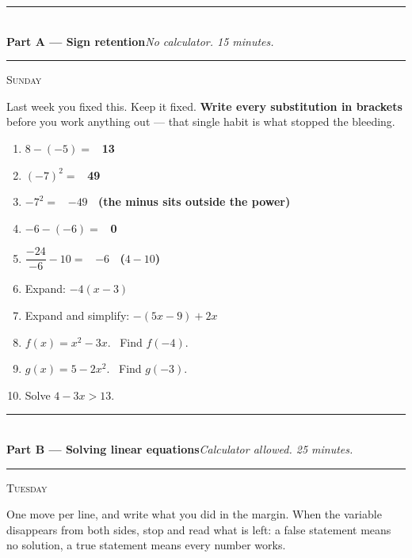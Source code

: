 \documentclass[11pt,a4paper]{article}
\newif\ifANSWERS
\newcommand{\PartHead}[2]{%
  \vspace{6pt}
  {\color{navy}\rule{\textwidth}{0.8pt}}\\[2pt]
  {\large\bfseries\color{navy}#1}\hfill{\small\itshape #2}\\[-4pt]
  {\color{navy}\rule{\textwidth}{0.4pt}}
  \vspace{4pt}
}
\newcommand{\sitting}[1]{{\footnotesize\textsc{\color{navy}#1}}\par\vspace{2pt}}
\newcommand{\ans}[1]{\ {\color{keyred}\bfseries #1}}
\newcommand{\note}[1]{\par{\footnotesize\color{keyred}#1}}
\newcommand{\ans}[1]{}
\newcommand{\note}[1]{}
\begin{document}
\PartHead{Part A --- Sign retention}{No calculator. 15 minutes.}
\sitting{Sunday}
Last week you fixed this. Keep it fixed. \textbf{Write every substitution in brackets}
before you work anything out --- that single habit is what stopped the bleeding.

\begin{enumerate}[leftmargin=20pt,itemsep=7pt]
\item $8-(-5)=$ \ifANSWERS\else\underline{\hspace{3.5cm}}\fi \ans{13}
\item $(-7)^2=$ \ifANSWERS\else\underline{\hspace{3.5cm}}\fi \ans{49}
\item $-7^2=$ \ifANSWERS\else\underline{\hspace{3.5cm}}\fi \ans{$-49$ \ (the minus sits outside the power)}
\item $-6-(-6)=$ \ifANSWERS\else\underline{\hspace{3.5cm}}\fi \ans{0}
\item $\dfrac{-24}{-6}-10=$ \ifANSWERS\else\underline{\hspace{3.5cm}}\fi \ans{$-6$ \ ($4-10$)}
\item Expand: $-4(x-3)$ \ifANSWERS\ans{$=-4x+12$}\else\ \underline{\hspace{5.4cm}}\fi
\item Expand and simplify: $-(5x-9)+2x$ \ifANSWERS\ans{$=-3x+9$}\else\ \underline{\hspace{4cm}}\fi
\item $f(x)=x^2-3x$. \ Find $f(-4)$. \ifANSWERS\ans{$=(-4)^2-3(-4)=16+12=28$}\else\ \underline{\hspace{4cm}}\fi
\item $g(x)=5-2x^2$. \ Find $g(-3)$. \ifANSWERS\ans{$=5-2(9)=-13$}\else\ \underline{\hspace{4cm}}\fi
\item Solve $4-3x>13$. \ifANSWERS\ans{$x<-3$. \ $-3x>9$, then divide by $-3$ \emph{and flip}. Check: $x=-4$ gives $16>13$, true.}\else\ \underline{\hspace{4.4cm}}\fi
\end{enumerate}

\ifANSWERS
\note{\textbf{Marking rule: below 8 of 10 means last week has decayed.} Open the next session with a fresh Part A before touching anything new. Items 2, 3 and 10 are the diagnostic ones.}
\fi

\newpage
\PartHead{Part B --- Solving linear equations}{Calculator allowed. 25 minutes.}
\sitting{Tuesday}
One move per line, and write what you did in the margin. When the variable disappears
from both sides, stop and read what is left: a false statement means no solution, a
true statement means every number works.
\end{document}
